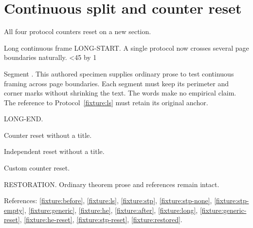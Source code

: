\section{Continuous split and counter reset}
All four protocol counters reset on a new section.
\protocolsavestate
\begin{lsprotocol}{Long continuous frame}\label{fixture:long}
\protocolbodyparagraph
LONG-START. A single protocol now crosses several page boundaries naturally.
\newcount\protocolparagraph
{}
\loop\ifnum\protocolparagraph<45
  \advance\protocolparagraph by 1
  \par\noindent Segment \the\protocolparagraph.
  This authored specimen supplies ordinary prose to test continuous framing
  across page boundaries. Each segment must keep its perimeter and corner
  marks without shrinking the text. The words make no empirical claim.
  The reference to Protocol~\ref{fixture:ls} must retain its original anchor.
\repeat
\par LONG-END.\label{fixture:long-end}
\end{lsprotocol}
\protocolcheckstate
\begin{protocol}\label{fixture:generic-reset}\protocolbodyparagraph Counter reset without a title.\end{protocol}
\begin{heprotocol}\label{fixture:he-reset}\protocolbodyparagraph Independent reset without a title.\end{heprotocol}
\begin{stpprotocol}\label{fixture:stp-reset}\protocolbodyparagraph Custom counter reset.\end{stpprotocol}
\protocolcheckstate
\begin{theorem}\label{fixture:restored}
RESTORATION. Ordinary theorem prose and references remain intact.
\end{theorem}
References: \ref{fixture:before}, \ref{fixture:ls}, \ref{fixture:stp},
\ref{fixture:stp-none}, \ref{fixture:stp-empty}, \ref{fixture:generic},
\ref{fixture:he}, \ref{fixture:after}, \ref{fixture:long},
\ref{fixture:generic-reset}, \ref{fixture:he-reset}, \ref{fixture:stp-reset},
\ref{fixture:restored}.

\clearpage
